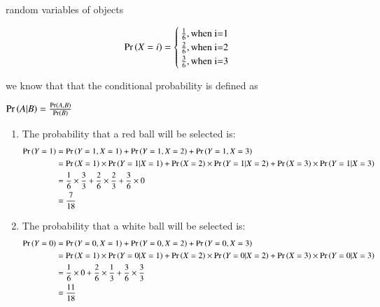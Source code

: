 \begin{table}[!ht]

\caption{random variables of objects}
\label{tab:exemplar 12.13.3.41}
\end{table}
\begin{align}
\Pr\left(X=i\right)=
\begin{cases}
\frac{1}{6},\text{when i=1}\\
\frac{2}{6},\text{when i=2}\\
\frac{3}{6},\text{when i=3}
\end{cases}
\end{align}

we know that that the conditional probability is defined as

                     $\Pr\left(A|B\right)=\frac{\Pr\left(A,B\right)}{\Pr\left(B\right)}$


\begin{enumerate}
\item
The probability that a red ball will be selected is:
\begin{align}
\Pr\left(Y=1\right)&=\Pr\left(Y=1,X=1\right)+\Pr\left(Y=1,X=2\right)+\Pr\left(Y=1,X=3\right)\\
&=\Pr\left(X=1\right)\times\Pr\left(Y=1|X=1\right)+\Pr\left(X=2\right)\times\Pr\left(Y=1|X=2\right)+\Pr\left(X=3\right)\times\Pr\left(Y=1|X=3\right)\\
&=\frac{1}{6}\times\frac{3}{3}+\frac{2}{6}\times\frac{2}{3}+\frac{3}{6}\times0\\
&=\frac{7}{18}
\end{align}
\item
The probability that a white ball will be selected is:
\begin{align}
\Pr\left(Y=0\right)&=\Pr\left(Y=0,X=1\right)+\Pr\left(Y=0,X=2\right)+\Pr\left(Y=0,X=3\right)\\
&=\Pr\left(X=1\right)\times\Pr\left(Y=0|X=1\right)+\Pr\left(X=2\right)\times\Pr\left(Y=0|X=2\right)+\Pr\left(X=3\right)\times\Pr\left(Y=0|X=3\right)\\
&=\frac{1}{6}\times0+\frac{2}{6}\times\frac{1}{3}+\frac{3}{6}\times\frac{3}{3}\\
&=\frac{11}{18}
\end{align}
\end{enumerate}



